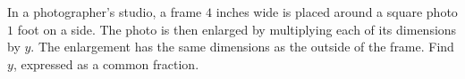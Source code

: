 In a photographer's studio, a frame $4$ inches wide is placed around a square photo $1$ foot on a side. The photo is then enlarged by multiplying each of its dimensions by $y$. The enlargement has the same dimensions as the outside of the frame. Find $y$, expressed as a common fraction.
